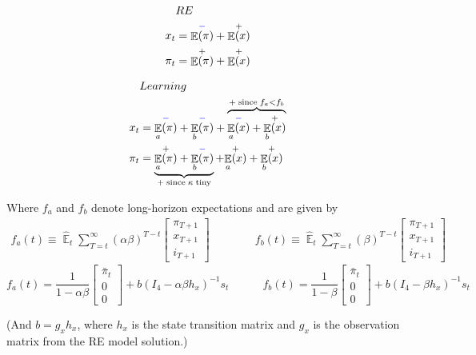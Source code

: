 \documentclass[11pt]{article}
\renewcommand{\[}{\begin{equation}}
\renewcommand{\]}{\end{equation}}
\DeclareMathOperator{\E}{\mathbb{E}}
\begin{document}
\vspace{-0.9cm}

\begin{multicols}{2}
\begin{align*}
& RE \\
x_t & = \overset{\textcolor{blue}{-}}{\E(\pi)} + \overset{+}{\E(x)} \\  
\pi_t & = \overset{+}{\E(\pi)} + \overset{+}{\E(x)} 
\end{align*}
\columnbreak

\vspace{0.1cm}

\begin{align*}
& Learning \\
x_t & = \overset{\textcolor{blue}{-}}{\E_a(\pi)}  + \overset{\textcolor{blue}{-}}{\E_b(\pi)}  
+ \overbrace{\overset{\textcolor{blue}{-}}{\E_a(x)}   + \overset{+}{\E_b(x)}}^{+ \; \text{since} \; f_a < f_b}   \\  
\pi_t & = \underbrace{\overset{+}{\E_a(\pi)} + \overset{\textcolor{blue}{-}}{\E_b(\pi)}}_{+ \; \text{since} \; \kappa \; \text{tiny}} 
+ \overset{+}{\E_a(x)} + \overset{+}{\E_b(x)}
\end{align*}
\end{multicols}

Where $f_a$ and $f_b$ denote long-horizon expectations and are given by
\begin{align}
f_a(t)  \equiv  \hat{\E}_t\sum_{T=t}^{\infty} (\alpha\beta)^{T-t } \begin{bmatrix} \pi_{T+1} \\ x_{T+1} \\ i_{T+1} \end{bmatrix} \quad \quad \quad \quad f_b(t)  \equiv \hat{\E}_t\sum_{T=t}^{\infty} (\beta)^{T-t } \begin{bmatrix} \pi_{T+1} \\ x_{T+1} \\ i_{T+1} \end{bmatrix}
\end{align}
\begin{equation}
f_a(t) = \frac{1}{1-\alpha\beta}\begin{bmatrix} \bar{\pi}_t \\ 0 \\ 0 \end{bmatrix} + b(I_4 - \alpha\beta h_x)^{-1}s_t \quad \quad \quad f_b(t) = \frac{1}{1-\beta}\begin{bmatrix} \bar{\pi}_t \\ 0 \\ 0 \end{bmatrix}  + b(I_4 - \beta h_x)^{-1}s_t  \label{fafb_obvious}
\end{equation}

(And $b = g_x h_x$, where $h_x$ is the state transition matrix and $g_x$ is the observation matrix from the RE model solution.)
\end{document}

